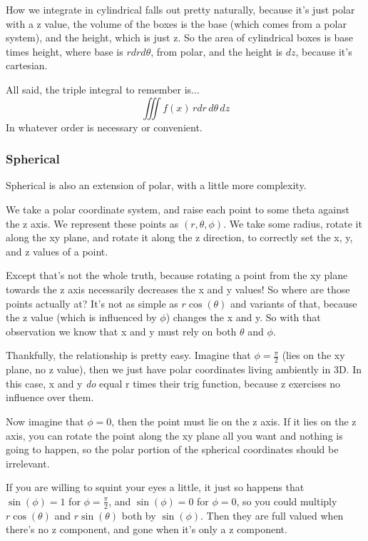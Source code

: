 \documentclass[12pt, letterpaper]{article}
\begin{document}
How we integrate in cylindrical falls out pretty naturally, because it's just polar with a z value, the volume of the boxes is the base (which comes from a polar system),
and the height, which is just z.
So the area of cylindrical boxes is base times height, where base is $r dr d\theta$, from polar, and the height is $dz$, because it's cartesian.

All said, the triple integral to remember is...
\begin{displaymath}
    \iiint f(x) \,rdr\,d\theta\,dz
\end{displaymath}
In whatever order is necessary or convenient.

\subsubsection{Spherical}
Spherical is also an extension of polar, with a little more complexity.

We take a polar coordinate system, and raise each point to some theta against the z axis.
We represent these points as $(r, \theta, \phi)$.
We take some radius, rotate it along the xy plane, and rotate it along the z direction, to correctly set the x, y, and z values of a point.

Except that's not the whole truth, because rotating a point from the xy plane towards the z axis necessarily decreases the x and y values!
So where are those points actually at?
It's not as simple as $r\cos(\theta)$ and variants of that, because the z value (which is influenced by $\phi$) changes the x and y.
So with that observation we know that x and y must rely on both $\theta$ and $\phi$.

Thankfully, the relationship is pretty easy.
Imagine that $\phi = \frac{\pi}{2}$ (lies on the xy plane, no z value), then we just have polar coordinates living ambiently in 3D.
In this case, x and y \emph{do} equal r times their trig function, because z exercises no influence over them.

Now imagine that $\phi = 0$, then the point must lie on the z axis.
If it lies on the z axis, you can rotate the point along the xy plane all you want and nothing is going to happen,
so the polar portion of the spherical coordinates should be irrelevant.

If you are willing to squint your eyes a little, it just so happens that $\sin(\phi) = 1$ for $\phi = \frac{\pi}{2}$,
and $\sin(\phi) = 0$ for $\phi = 0$, so you could multiply $r\cos(\theta)$ and $r\sin(\theta)$ both by $\sin(\phi)$.
Then they are full valued when there's no z component, and gone when it's only a z component.
\end{document}
